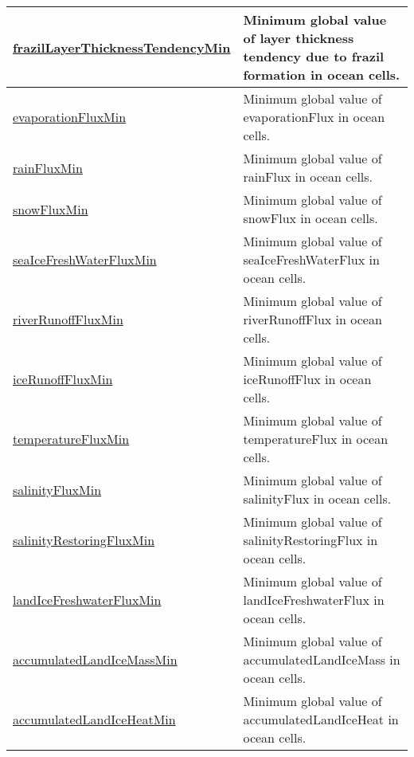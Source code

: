 {\begin{center}
\begin{longtable}{| p{2.0in} | p{4.0in} |}
    \hline
    \hyperref[subsec:var_sec_globalStatsAM_frazilLayerThicknessTendencyMin]{frazilLayerThicknessTendencyMin} & Minimum global value of layer thickness tendency due to frazil formation in ocean cells. \\
    \hline
    \hyperref[subsec:var_sec_globalStatsAM_evaporationFluxMin]{evaporationFluxMin} & Minimum global value of evaporationFlux in ocean cells. \\
    \hline
    \hyperref[subsec:var_sec_globalStatsAM_rainFluxMin]{rainFluxMin} & Minimum global value of rainFlux in ocean cells. \\
    \hline
    \hyperref[subsec:var_sec_globalStatsAM_snowFluxMin]{snowFluxMin} & Minimum global value of snowFlux in ocean cells. \\
    \hline
    \hyperref[subsec:var_sec_globalStatsAM_seaIceFreshWaterFluxMin]{seaIceFreshWaterFluxMin} & Minimum global value of seaIceFreshWaterFlux in ocean cells. \\
    \hline
    \hyperref[subsec:var_sec_globalStatsAM_riverRunoffFluxMin]{riverRunoffFluxMin} & Minimum global value of riverRunoffFlux in ocean cells. \\
    \hline
    \hyperref[subsec:var_sec_globalStatsAM_iceRunoffFluxMin]{iceRunoffFluxMin} & Minimum global value of iceRunoffFlux in ocean cells. \\
    \hline
    \hyperref[subsec:var_sec_globalStatsAM_temperatureFluxMin]{temperatureFluxMin} & Minimum global value of temperatureFlux in ocean cells. \\
    \hline
    \hyperref[subsec:var_sec_globalStatsAM_salinityFluxMin]{salinityFluxMin} & Minimum global value of salinityFlux in ocean cells. \\
    \hline
    \hyperref[subsec:var_sec_globalStatsAM_salinityRestoringFluxMin]{salinityRestoringFluxMin} & Minimum global value of salinityRestoringFlux in ocean cells. \\
    \hline
    \hyperref[subsec:var_sec_globalStatsAM_landIceFreshwaterFluxMin]{landIceFreshwaterFluxMin} & Minimum global value of landIceFreshwaterFlux in ocean cells. \\
    \hline
    \hyperref[subsec:var_sec_globalStatsAM_accumulatedLandIceMassMin]{accumulatedLandIceMassMin} & Minimum global value of accumulatedLandIceMass in ocean cells. \\
    \hline
    \hyperref[subsec:var_sec_globalStatsAM_accumulatedLandIceHeatMin]{accumulatedLandIceHeatMin} & Minimum global value of accumulatedLandIceHeat in ocean cells. \\

\end{longtable}
\end{center}}
